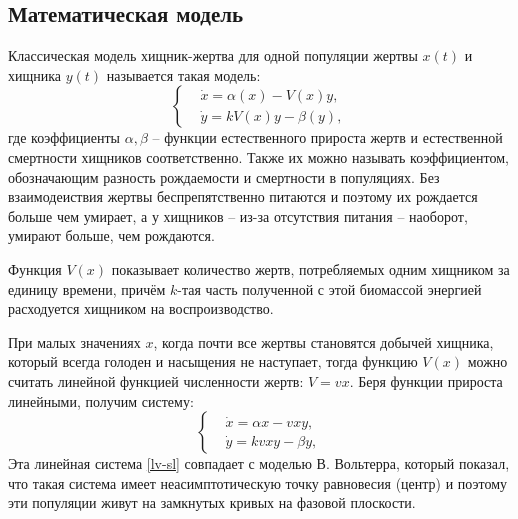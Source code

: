 \subsection{Математическая модель}
    Классическая модель хищник-жертва для одной популяции жертвы \(x(t)\) и хищника \(y(t)\) называется такая модель\cite{svilog}:
    \begin{equation}
        \left\{\begin{split}
            & \dot{x} = \alpha(x) - V(x)y, \\
            & \dot{y} = k V(x)y -\beta(y),
        \end{split}\right. \label{lv-s}
    \end{equation}
    где коэффициенты \( \alpha, \beta \) -- функции естественного прироста жертв и естественной смертности хищников соответственно. Также их можно называть коэффициентом, обозначающим разность рождаемости и смертности в популяциях. Без взаимодеиствия жертвы беспрепятственно питаются и поэтому их рождается больше чем умирает, а у хищников -- из-за отсутствия питания -- наоборот, умирают больше, чем рождаются.

    Функция \( V(x) \) показывает количество жертв, потребляемых одним хищником за единицу времени, причём \(k\)-тая часть полученной с этой биомассой энергией расходуется хищником на воспроизводство. 
    
    При малых значениях \(x\), когда почти все жертвы становятся добычей хищника, который всегда голоден и насыщения не наступает, тогда функцию \( V(x) \) можно считать линейной функцией численности жертв: \( V = vx \). Беря функции прироста линейными, получим систему:
    \begin{equation}
        \left\{\begin{split}
            & \dot{x} = \alpha x - v x y, \\
            & \dot{y} = k v x y - \beta y,
        \end{split}\right. \label{lv-sl}
    \end{equation}
    Эта линейная система \eqref{lv-sl} совпадает с моделью В. Вольтерра, который показал, что такая система имеет неасимптотическую точку равновесия (центр) и поэтому эти популяции живут на замкнутых кривых на фазовой плоскости\cite{svilog}.

